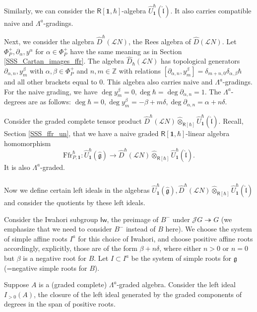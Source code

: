 \documentclass{amsart}
\theoremstyle{definition}
\newcommand{\sss}{\subsubsection{}}
\newcommand{\Ring}{\mathsf{R}}
\newcommand{\g}{\mathfrak{g}}
\newcommand{\hg}{\hat{\mathfrak{g}}}
\newcommand{\Z}{\mathbb{Z}}
\newcommand{\Jet}{\mathscr{J}}
\newcommand{\Loop}{\mathscr{L}}
\newcommand{\bone}{\mathbf{1}}
\newcommand{\hl}{\hat{\mathfrak{l}}}
\newcommand{\Iw}{\mathsf{Iw}}
\newcommand{\Ffr}{\mathrm{{Ffr}}}
\numberwithin{equation}{section}
\begin{document}
Similarly, we can consider the $\Ring[\bone,\hbar]$-algebra $\widehat{U}^\hbar_{\bone}(\hl)$. It also carries compatible naive and $\Lambda^a$-gradings. 

Next, 
we consider the algebra $\widehat{D}^\hbar(\Loop N)$, the Rees algebra of $\widehat{D}(\Loop N)$. Let $\Phi_P^+,\partial_\alpha,y^\alpha$ for $\alpha\in \Phi^+_P$
have the same meaning as in Section \ref{SSS_Cartan_images_ffr}. The algebra $\widehat{D}_\hbar(\Loop N)$ has topological generators $\partial_{\alpha,n}, y^\beta_m$ with $\alpha,\beta\in \Phi^+_P$ and $n,m\in \Z$ with relations 
$[\partial_{\alpha,n},y^{\beta}_m]=\delta_{m+n,0}\delta_{\alpha,\beta}\hbar$
and all other brackets equal to $0$. This algebra also carries naive and $\Lambda^a$-gradings. For the naive grading, we have $\deg y^\beta_m=0, \deg \hbar=\deg \partial_{\alpha,n}=1$. The $\Lambda^a$-degrees are as follows:
$\deg \hbar=0, \deg y^\beta_m=-\beta+m\delta, \deg \partial_{\alpha,n}=\alpha+n\delta$. 

Consider the graded complete tensor product $\widehat{D}^\hbar(\Loop N)\widehat{\otimes}_{\Ring[\hbar]}\widehat{U}^\hbar_{\bone}(\hl)$. Recall, Section \ref{SSS_ffr_un}, that we have a naive graded $\Ring[\bone,\hbar]$-linear algebra homomorphism
$$\Ffr_{P,\bone}^\hbar:  \widehat{U}_{\bone}^\hbar(\hg)\rightarrow \widehat{D}^\hbar(\Loop N)\widehat{\otimes}_{\Ring[\hbar]}\widehat{U}^\hbar_{\bone}(\hl).$$
It is also $\Lambda^a$-graded. 

\sss\label{SSS_Verma_Wakimoto}
Now we define certain left ideals in the algebras $\widehat{U}_{\bone}^\hbar(\hg), \widehat{D}^\hbar(\Loop N)\widehat{\otimes}_{\Ring[\hbar]}\widehat{U}_{\bone}^{\hbar}(\hl)$ and consider the quotients by these left ideals. 

Consider the Iwahori subgroup $\Iw$, the preimage of $B^-$ under $\Jet G\twoheadrightarrow G$ (we emphasize that we need to consider $B^-$ instead of $B$ here). We choose the system of simple affine roots $I^a$
for this choice of Iwahori, and choose positive affine roots accordingly, explicitly, those are of the form $\beta+n\delta$, where either $n>0$ or $n=0$ but $\beta$ is a negative root for $B$. Let $I\subset I^a$ be the system of simple roots for $\g$ (=negative simple roots for $B$). 

Suppose $A$ is a (graded complete) $\Lambda^a$-graded algebra. Consider the left ideal $I_{>0}(A)$, the closure of the left ideal
generated by the graded components of degrees in the span of positive roots.
\end{document}
